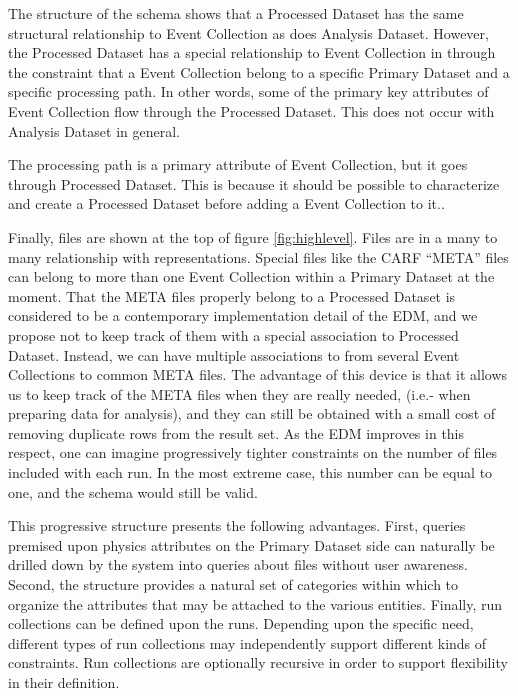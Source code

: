 \documentclass{cmspaper}
\begin{document}
The structure of the schema shows that a Processed Dataset has the same 
structural relationship to Event Collection as does Analysis Dataset.  However,
the Processed Dataset has a special relationship to Event Collection in through 
the constraint that a Event Collection belong to a specific Primary Dataset and a 
specific processing path.  In other words, some of the primary key attributes 
of Event Collection flow through the Processed Dataset.  This does not occur 
with Analysis Dataset in general.

The processing path is a primary attribute of Event Collection, but it goes through 
Processed Dataset.  This is because it should be possible to characterize and
create a Processed Dataset before adding a Event Collection to it..  

Finally, files are shown at the top of figure \ref{fig:highlevel}. Files are in a many to 
many relationship with representations.  Special files like the CARF ``META'' files
can belong to more than one Event Collection within a Primary Dataset at the moment.
That the META files properly belong to a Processed Dataset is considered to 
be a contemporary  implementation detail of the EDM, and we propose not to keep track 
of them with a special association to Processed Dataset.  Instead, we can have 
multiple associations to from several Event Collections to common META files.  The 
advantage of this 
device is that it allows us to keep track of the META files when they are really needed, 
(i.e.- when preparing data for analysis), and they can still be obtained with a 
small cost of removing duplicate rows from the result set.  As the EDM improves in this 
respect, one can imagine progressively tighter constraints on the number of files included 
with each run.   In the most extreme case, this number can be equal to one, and the schema 
would still be valid.

This progressive structure presents the following advantages.  First, queries 
premised upon physics attributes on the Primary Dataset side 
can naturally be drilled down by the system into queries about files without user awareness.
Second,  the structure provides a natural set of categories within which to organize the 
attributes that may be attached to the various entities.  Finally, run collections can be 
defined upon the runs.  Depending upon the specific need, different types of run collections 
may independently support different kinds of constraints.  Run collections are optionally 
recursive in order to support flexibility in their definition.
\end{document}
